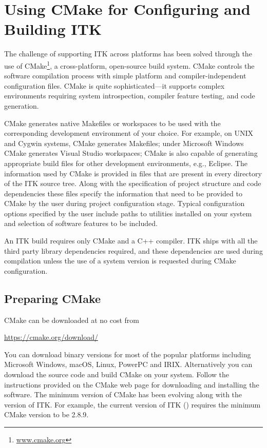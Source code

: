 \section{Using CMake for Configuring and Building ITK}
\label{sec:UsingCMakeForConfiguringAndBuildingITK}

The challenge of supporting ITK across platforms has been solved through the
use of CMake\footnote{\url{www.cmake.org}}, a cross-platform, open-source build
system. CMake controls the software compilation process with simple platform
and compiler-independent configuration files. CMake is quite sophisticated---it
supports complex environments requiring system introspection, compiler feature
testing, and code generation.

CMake generates native Makefiles or workspaces to be used with the corresponding
development environment of your choice. For example, on UNIX and Cygwin systems,
CMake generates Makefiles; under Microsoft Windows CMake generates Visual Studio
workspaces; CMake is also capable of generating appropriate build files for
other development environments, e.g., Eclipse. The information used by CMake is
provided in  files that are present in every directory of
the ITK source tree. Along with the specification of project structure and code
dependencies these files specify the information that need to be provided to
CMake by the user during project configuration stage. Typical configuration
options specified by the user include paths to utilities installed on your
system and selection of software features to be included.

An ITK build requires only CMake and a C++ compiler. ITK ships with all the
third party library dependencies required, and these dependencies are used
during compilation unless the use of a system version is requested during CMake
configuration.

\subsection{Preparing CMake}
\label{sec:CMakeforITK}


CMake can be downloaded at no cost from
\begin{center}
  \url{https://cmake.org/download/}
\end{center}

You can download binary versions for most of the popular platforms including
Microsoft Windows, macOS, Linux, PowerPC and IRIX. Alternatively you can
download the source code and build CMake on your system. Follow the instructions
provided on the CMake web page for downloading and installing the software. The
minimum version of CMake has been evolving along with the version of ITK. For
example, the current version of ITK (\ITKVERSIONMAJORMINOR) requires the minimum
CMake version to be 2.8.9.

